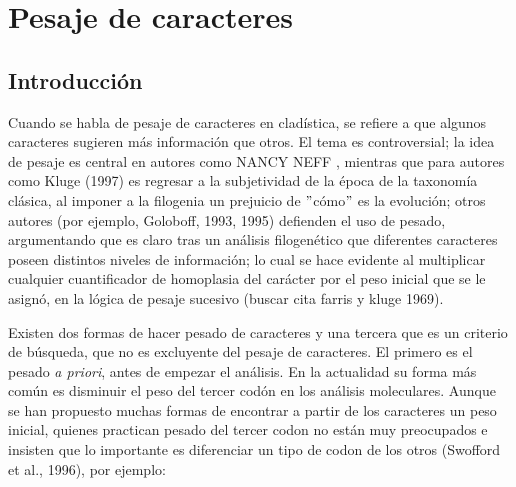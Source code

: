 \chapter{Pesaje de caracteres}
\section*{Introducci\'on}
Cuando se habla de pesaje de caracteres en clad\'istica, se refiere a que algunos caracteres sugieren m\'as informaci\'on que otros. El tema es controversial;
la idea de pesaje es central en autores como NANCY NEFF 
, mientras que para autores como  Kluge (1997) es regresar a la subjetividad de la \'epoca de la taxonom\'ia cl\'asica, al imponer a la filogenia un prejuicio de $"$c\'omo$"$ es la evoluci\'on; 
otros autores (por ejemplo, Goloboff, 1993, 1995) defienden el uso de pesado, argumentando que es claro tras un an\'alisis filogen\'etico que diferentes caracteres poseen distintos niveles de  informaci\'on; lo cual se hace evidente al multiplicar cualquier cuantificador de homoplasia del car\'acter por el peso inicial que se le asign\'o, en la l\'ogica de pesaje sucesivo (buscar cita farris y kluge 1969).


Existen dos formas de hacer pesado de caracteres y una tercera que es un criterio de b\'usqueda, que no es  excluyente del pesaje de caracteres. El primero es el pesado \textit{a priori}, antes de empezar el an\'alisis. 
En la actualidad su forma m\'as com\'un es disminuir el peso del tercer cod\'on en los an\'alisis moleculares. Aunque se han propuesto muchas formas de encontrar a partir de los caracteres un peso inicial, quienes practican pesado del tercer codon no est\'an muy preocupados e insisten que lo importante es diferenciar un tipo de codon de los otros (Swofford et al., 1996), por ejemplo:

% 

